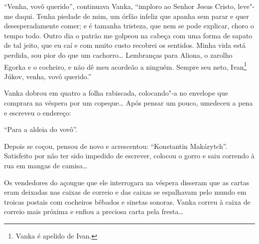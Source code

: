 ``Venha, vovô querido'', continuava Vanka, ``imploro ao Senhor Jesus
Cristo, leve"-me daqui. Tenha piedade de mim, um órfão infeliz que apanha
sem parar e quer desesperadamente comer; e é tamanha tristeza, que nem
se pode explicar, choro o tempo todo. Outro dia o patrão me golpeou na
cabeça com uma forma de sapato de tal jeito, que eu caí e com muito
custo recobrei os sentidos. Minha vida está perdida, sou pior do que um
cachorro\ldots{} Lembranças para Aliona, o zarolho Egorka e o cocheiro, e não
dê meu acordeão a ninguém. Sempre seu neto, Ivan\footnote{Vanka é
  apelido de Ivan.} Júkov, venha, vovô querido.''

Vanka dobrou em quatro a folha rabiscada, colocando"-a no envelope que
comprara na véspera por um copeque\ldots{} Após pensar um pouco, umedeceu a
pena e escreveu o endereço:

``Para a aldeia do vovô''.

Depois se coçou, pensou de novo e acrescentou: ``Konstantin Makárytch''.
Satisfeito por não ter sido impedido de escrever, colocou o gorro e saiu
correndo à rua em mangas de camisa\ldots{}

Os vendedores do açougue que ele interrogara na véspera disseram que as
cartas eram deixadas nas caixas de correio e das caixas se espalhavam
pelo mundo em troicas postais com cocheiros bêbados e sinetas sonoras.
Vanka correu à caixa de correio mais próxima e enfiou a preciosa carta
pela fresta\ldots{}

